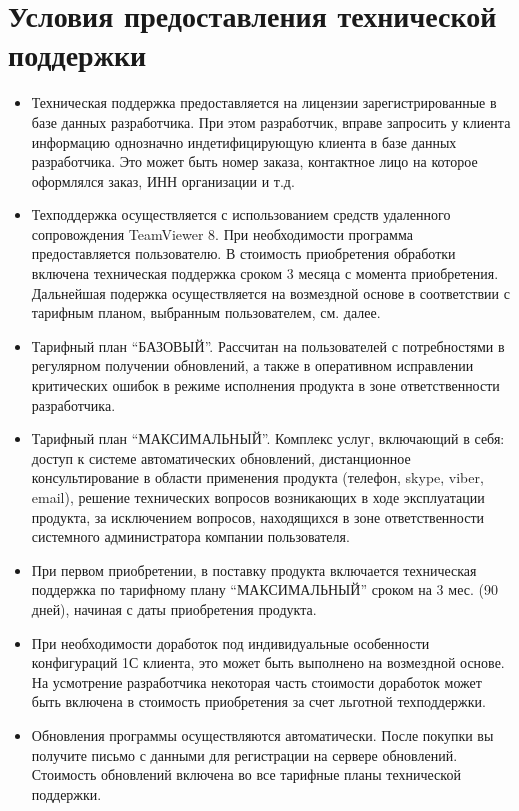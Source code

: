 \documentclass[letterpaper,10pt,russian]{sphinxmanual}
\begin{document}
\section{Условия предоставления технической поддержки}
\label{intro:id6}\begin{itemize}
\item {} 
Техническая поддержка предоставляется на лицензии зарегистрированные в базе данных разработчика. При этом разработчик, вправе запросить у клиента информацию однозначно индетифицирующую клиента в базе данных разработчика. Это может быть номер заказа, контактное лицо на которое оформлялся заказ, ИНН организации и т.д.

\item {} 
Техподдержка осуществляется с использованием средств удаленного сопровождения TeamViewer 8. При необходимости программа предоставляется  пользователю. В стоимость приобретения обработки включена техническая поддержка сроком 3 месяца с момента приобретения. Дальнейшая подержка осуществляется на возмездной основе в соответствии с тарифным планом, выбранным пользователем, см. далее.

\item {} 
Тарифный план ``БАЗОВЫЙ''. Рассчитан на пользователей с потребностями в регулярном получении обновлений, а также в оперативном исправлении критических ошибок в режиме исполнения продукта в зоне ответственности разработчика.

\item {} 
Тарифный план ``МАКСИМАЛЬНЫЙ''. Комплекс услуг, включающий в себя: доступ к системе автоматических обновлений, дистанционное консультирование в области применения продукта (телефон, skype, viber, email), решение технических вопросов возникающих в ходе эксплуатации продукта, за исключением вопросов, находящихся в зоне ответственности системного администратора компании пользователя.

\item {} 
При первом приобретении, в поставку продукта включается техническая поддержка по тарифному плану ``МАКСИМАЛЬНЫЙ'' сроком на 3 мес. (90 дней), начиная с даты приобретения продукта.

\item {} 
При необходимости доработок под индивидуальные особенности конфигураций 1С клиента, это может быть выполнено на возмездной основе. На усмотрение разработчика некоторая часть стоимости доработок может быть включена в стоимость приобретения за счет льготной техподдержки.

\item {} 
Обновления программы осуществляются автоматически. После покупки вы получите письмо с данными для регистрации на сервере обновлений. Стоимость обновлений включена во все тарифные планы технической поддержки.

\end{itemize}
\end{document}

